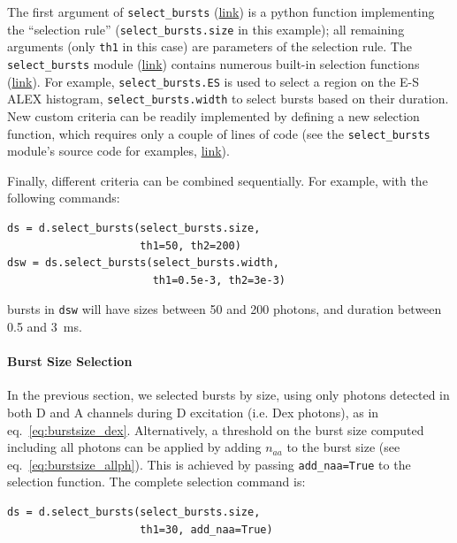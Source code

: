 \documentclass[10pt,letterpaper]{article}
\begin{document}
The first argument of \verb|select_bursts|
(\href{http://fretbursts.readthedocs.org/en/latest/data_class.html#burst-selection-methods}{link})
is a python function implementing the ``selection rule'' (\verb|select_bursts.size| in this example);
all remaining arguments (only \verb|th1| in this case) are parameters of the selection rule.
The \verb|select_bursts| module
(\href{http://fretbursts.readthedocs.org/en/latest/burst_selection.html}{link})
contains numerous built-in selection functions
(\href{http://fretbursts.readthedocs.org/en/latest/burst_selection.html#module-fretbursts.select_bursts}{link}).
For example,
\verb|select_bursts.ES|
is used to select a region on the E-S ALEX histogram,
\verb|select_bursts.width|
to select bursts based on their duration.
New custom criteria can be readily implemented by defining a new selection function,
which requires only a couple of lines of code (see the
\verb|select_bursts| module's source code for examples,
\href{https://github.com/tritemio/FRETBursts/blob/master/fretbursts/select_bursts.py}{link}).

Finally, different criteria can be combined sequentially.
For example, with the following commands:

\begin{lstlisting}
ds = d.select_bursts(select_bursts.size,
                     th1=50, th2=200)
dsw = ds.select_bursts(select_bursts.width,
                       th1=0.5e-3, th2=3e-3)
\end{lstlisting}

bursts in \verb|dsw|
will have sizes between 50 and 200 photons, and duration between 0.5 and 3~ms.

\paragraph{Burst Size Selection}
In the previous section, we selected bursts by size, using only 
photons detected in both D and A channels during D excitation (i.e. Dex photons), 
as in eq.~\ref{eq:burstsize_dex}.
Alternatively, a threshold on the burst size computed including all photons 
can be applied by adding $n_{aa}$ to the burst size (see eq.~\ref{eq:burstsize_allph}). 
This is achieved
by passing \verb|add_naa=True| to the selection function. 
The complete selection command is:

\begin{lstlisting}
ds = d.select_bursts(select_bursts.size,
                     th1=30, add_naa=True)
\end{lstlisting}
\end{document}
